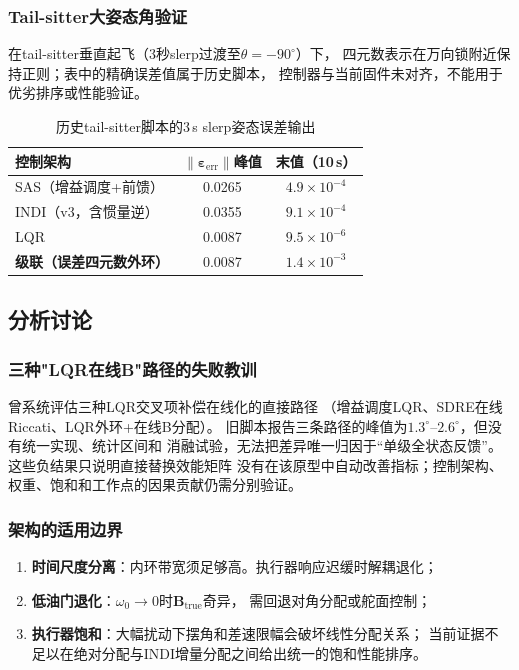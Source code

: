 \subsubsection{Tail-sitter大姿态角验证}

在tail-sitter垂直起飞（3秒slerp过渡至$\theta=-90^\circ$）下，
四元数表示在万向锁附近保持正则；表中的精确误差值属于历史脚本，
控制器与当前固件未对齐，不能用于优劣排序或性能验证。

\begin{table}[H]
\centering
\caption{历史tail-sitter脚本的3\,s slerp姿态误差输出}
\label{tab:cascade_ch_vtol2}
\small
\begin{tabular}{l c c}
\toprule
\textbf{控制架构} & $\|\boldsymbol{\varepsilon}_{\mathrm{err}}\|$峰值 & 末值（10\,s） \\
\midrule
SAS（增益调度+前馈） & 0.0265 & $4.9\times10^{-4}$ \\
INDI（v3，含惯量逆） & 0.0355 & $9.1\times10^{-4}$ \\
LQR & 0.0087 & $9.5\times10^{-6}$ \\
\textbf{级联（误差四元数外环）} & 0.0087 & $1.4\times10^{-3}$ \\
\bottomrule
\end{tabular}
\end{table}

\subsection{分析讨论}
\label{sec:cascade_analysis}

\subsubsection{三种"LQR在线B"路径的失败教训}

曾系统评估三种LQR交叉项补偿在线化的直接路径
（增益调度LQR、SDRE在线Riccati、LQR外环+在线B分配）。
旧脚本报告三条路径的峰值为$1.3^\circ$--$2.6^\circ$，但没有统一实现、统计区间和
消融试验，无法把差异唯一归因于“单级全状态反馈”。这些负结果只说明直接替换效能矩阵
没有在该原型中自动改善指标；控制架构、权重、饱和和工作点的因果贡献仍需分别验证。

\subsubsection{架构的适用边界}

\begin{enumerate}[label=(\arabic*)]
    \item \textbf{时间尺度分离}：内环带宽须足够高。执行器响应迟缓时解耦退化；
    \item \textbf{低油门退化}：$\omega_0\to0$时$\mathbf{B}_{\mathrm{true}}$奇异，
          需回退对角分配或舵面控制；
    \item \textbf{执行器饱和}：大幅扰动下摆角和差速限幅会破坏线性分配关系；
          当前证据不足以在绝对分配与INDI增量分配之间给出统一的饱和性能排序。
\end{enumerate}

